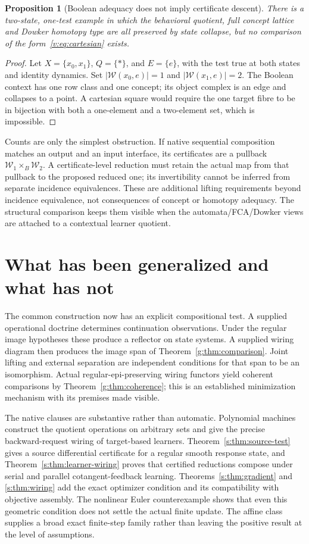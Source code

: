 \documentclass[11pt]{article}
\newtheorem{proposition}[theorem]{Proposition}
\theoremstyle{definition}
\theoremstyle{remark}\newtheorem{remark}[theorem]{Remark}
\begin{document}
\begin{proposition}[Boolean adequacy does not imply certificate descent]
There is a two-state, one-test example in which the behavioral quotient,
full concept lattice and Dowker homotopy type are all preserved by state
collapse, but no comparison of the form~\eqref{v:eq:cartesian} exists.
\end{proposition}
\begin{proof}
Let $X=\{x_0,x_1\}$, $Q=\{*\}$, and $E=\{e\}$, with the test true
at both states and identity dynamics. Set
$|\mathcal W(x_0,e)|=1$ and $|\mathcal W(x_1,e)|=2$.
The Boolean context has one row class and one concept; its object complex
is an edge and collapses to a point. A cartesian square would require the
one target fibre to be in bijection with both a one-element and a
two-element set, which is impossible.
\end{proof}

Counts are only the simplest obstruction. If native sequential composition
matches an output and an input interface, its certificates are a pullback
$\mathcal W_1\times_B\mathcal W_2$. A certificate-level reduction must
retain the actual map from that pullback to the proposed reduced one;
its invertibility cannot be inferred from separate incidence equivalences.
These are additional lifting requirements beyond incidence equivalence,
not consequences of concept or homotopy adequacy. The structural comparison
keeps them visible when the automata/FCA/Dowker views are attached to a
contextual learner quotient.




\section{What has been generalized and what has not}
The common construction now has an explicit compositional test. A supplied
operational doctrine determines continuation observations. Under the regular
image hypotheses these produce a reflector on state systems. A supplied
wiring diagram then produces the image span of
Theorem~\ref{g:thm:comparison}. Joint lifting and external separation are
independent conditions for that span to be an isomorphism. Actual
regular-epi-preserving wiring functors yield coherent comparisons by
Theorem~\ref{g:thm:coherence}; this is an established minimization mechanism
with its premises made visible.

The native clauses are substantive rather than automatic. Polynomial
machines construct the quotient operations on arbitrary sets and give the
precise backward-request wiring of target-based learners.
Theorem~\ref{s:thm:source-test} gives a source differential certificate
for a regular smooth response state, and
Theorem~\ref{s:thm:learner-wiring} proves that certified reductions compose
under serial and parallel cotangent-feedback learning.
Theorems~\ref{s:thm:gradient} and \ref{s:thm:wiring} add the exact optimizer
condition and its compatibility with objective assembly. The nonlinear Euler
counterexample shows that even this geometric condition does not settle the
actual finite update. The affine class supplies a broad exact finite-step
family rather than leaving the positive result at the level of assumptions.
\end{document}
